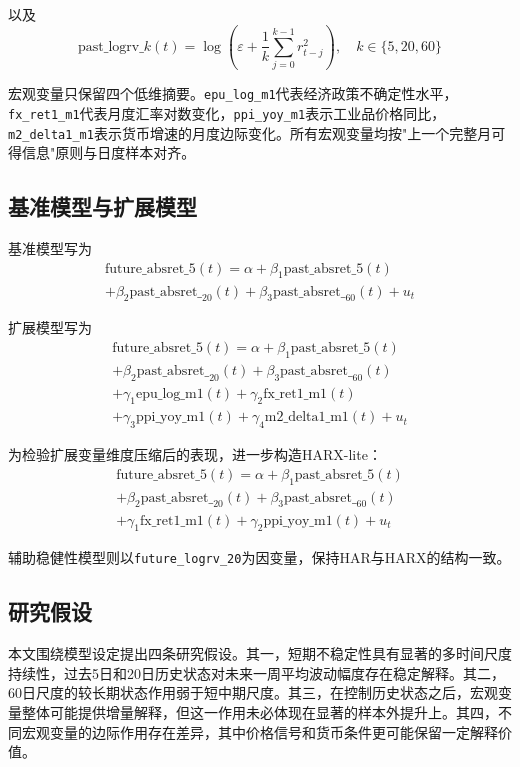 以及
\begin{equation}
\text{past\_logrv\_}k(t)=\log\left(\varepsilon+\frac{1}{k}\sum_{j=0}^{k-1}r_{t-j}^2\right),\quad k\in\{5,20,60\}
\end{equation}

宏观变量只保留四个低维摘要。\texttt{epu\_log\_m1}代表经济政策不确定性水平，\texttt{fx\_ret1\_m1}代表月度汇率对数变化，\texttt{ppi\_yoy\_m1}表示工业品价格同比，\texttt{m2\_delta1\_m1}表示货币增速的月度边际变化。所有宏观变量均按"上一个完整月可得信息"原则与日度样本对齐。

\subsection{基准模型与扩展模型}

基准模型写为
\begin{multline}
\text{future\_absret\_5}(t)=\alpha+\beta_1 \text{past\_absret\_5}(t)\\
+\beta_2 \text{past\_absret\_}_{20}(t)+\beta_3 \text{past\_absret\_}_{60}(t)+u_t
\end{multline}

扩展模型写为
\begin{multline}
\text{future\_absret\_5}(t)=\alpha+\beta_1 \text{past\_absret\_5}(t)\\
+\beta_2 \text{past\_absret\_}_{20}(t)+\beta_3 \text{past\_absret\_}_{60}(t)\\
+\gamma_1 \text{epu\_log\_m1}(t)+\gamma_2 \text{fx\_ret1\_m1}(t)\\
+\gamma_3 \text{ppi\_yoy\_m1}(t)+\gamma_4 \text{m2\_delta1\_m1}(t)+u_t
\end{multline}

为检验扩展变量维度压缩后的表现，进一步构造HARX-lite：
\begin{multline}
\text{future\_absret\_5}(t)=\alpha+\beta_1 \text{past\_absret\_5}(t)\\
+\beta_2 \text{past\_absret\_}_{20}(t)+\beta_3 \text{past\_absret\_}_{60}(t)\\
+\gamma_1 \text{fx\_ret1\_m1}(t)+\gamma_2 \text{ppi\_yoy\_m1}(t)+u_t
\end{multline}

辅助稳健性模型则以\texttt{future\_logrv\_20}为因变量，保持HAR与HARX的结构一致。

\subsection{研究假设}

本文围绕模型设定提出四条研究假设。其一，短期不稳定性具有显著的多时间尺度持续性，过去5日和20日历史状态对未来一周平均波动幅度存在稳定解释。其二，60日尺度的较长期状态作用弱于短中期尺度。其三，在控制历史状态之后，宏观变量整体可能提供增量解释，但这一作用未必体现在显著的样本外提升上。其四，不同宏观变量的边际作用存在差异，其中价格信号和货币条件更可能保留一定解释价值。

